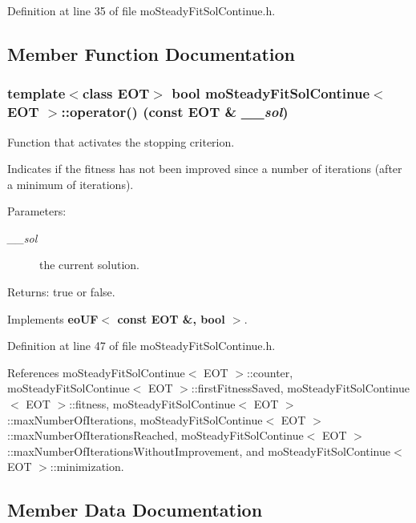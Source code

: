 Definition at line 35 of file moSteadyFitSolContinue.h.

\subsection{Member Function Documentation}
\subsubsection{\setlength{\rightskip}{0pt plus 5cm}template$<$class EOT$>$ bool {\bf moSteadyFitSolContinue}$<$ EOT $>$::operator() (const EOT \& {\em \_\-\_\-sol})\hspace{0.3cm}{\tt  [inline, virtual]}}\label{classmo_steady_fit_sol_continue_942e58ec00bb61000a83c80176e14bc3}


Function that activates the stopping criterion. 

Indicates if the fitness has not been improved since a number of iterations (after a minimum of iterations).

\begin{Desc}
\item[Parameters:]
\begin{description}
\item[{\em \_\-\_\-sol}]the current solution. \end{description}
\end{Desc}
\begin{Desc}
\item[Returns:]true or false. \end{Desc}


Implements {\bf eoUF$<$ const EOT \&, bool $>$}.

Definition at line 47 of file moSteadyFitSolContinue.h.

References moSteadyFitSolContinue$<$ EOT $>$::counter, moSteadyFitSolContinue$<$ EOT $>$::firstFitnessSaved, moSteadyFitSolContinue$<$ EOT $>$::fitness, moSteadyFitSolContinue$<$ EOT $>$::maxNumberOfIterations, moSteadyFitSolContinue$<$ EOT $>$::maxNumberOfIterationsReached, moSteadyFitSolContinue$<$ EOT $>$::maxNumberOfIterationsWithoutImprovement, and moSteadyFitSolContinue$<$ EOT $>$::minimization.

\subsection{Member Data Documentation}
